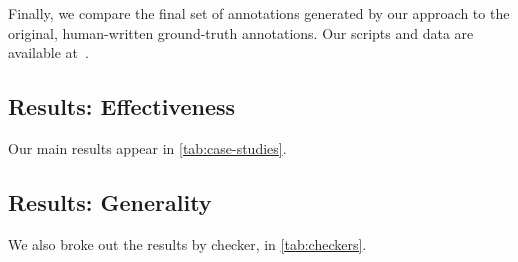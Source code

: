 Finally, we compare the final set of annotations generated by our approach to the original,
human-written ground-truth annotations. Our scripts and data are available
at~.

\subsection{Results: Effectiveness}
\label{sec:results}

Our main results appear in \cref{tab:case-studies}. 

\subsection{Results: Generality}
\label{sec:by-checker}



We also broke out the results by checker, in \cref{tab:checkers}. 


